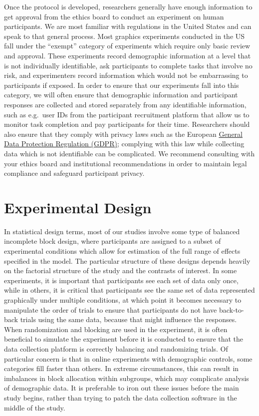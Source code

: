 \documentclass[
  10pt,
  letterpaper,
  DIV=11,
  numbers=noendperiod]{scrartcl}
\begin{document}
Once the protocol is developed, researchers generally have enough
information to get approval from the ethics board to conduct an
experiment on human participants. We are most familiar with regulations
in the United States and can speak to that general process. Most
graphics experiments conducted in the US fall under the ``exempt''
category of experiments which require only basic review and approval.
These experiments record demographic information at a level that is not
individually identifiable, ask participants to complete tasks that
involve no risk, and experimenters record information which would not be
embarrassing to participants if exposed. In order to ensure that our
experiments fall into this category, we will often ensure that
demographic information and participant responses are collected and
stored separately from any identifiable information, such as e.g.~user
IDs from the participant recruitment platform that allow us to monitor
task completion and pay participants for their time. Researchers should
also ensure that they comply with privacy laws such as the European
\href{https://gdpr-info.eu/chapter-3/}{General Data Protection
Regulation (GDPR)}; complying with this law while collecting data which
is not identifiable can be complicated. We recommend consulting with
your ethics board and institutional recommendations in order to maintain
legal compliance and safeguard participant privacy.

\section{Experimental Design}\label{sec-exp-design}

In statistical design terms, most of our studies involve some type of
balanced incomplete block design, where participants are assigned to a
subset of experimental conditions which allow for estimation of the full
range of effects specified in the model. The particular structure of
these designs depends heavily on the factorial structure of the study
and the contrasts of interest. In some experiments, it is important that
participants see each set of data only once, while in others, it is
critical that participants see the same set of data represented
graphically under multiple conditions, at which point it becomes
necessary to manipulate the order of trials to ensure that participants
do not have back-to-back trials using the same data, because that might
influence the responses. When randomization and blocking are used in the
experiment, it is often beneficial to simulate the experiment before it
is conducted to ensure that the data collection platform is correctly
balancing and randomizing trials. Of particular concern is that in
online experiments with demographic controls, some categories fill
faster than others. In extreme circumstances, this can result in
imbalances in block allocation within subgroups, which may complicate
analysis of demographic data. It is preferable to iron out these issues
before the main study begins, rather than trying to patch the data
collection software in the middle of the study.
\end{document}

